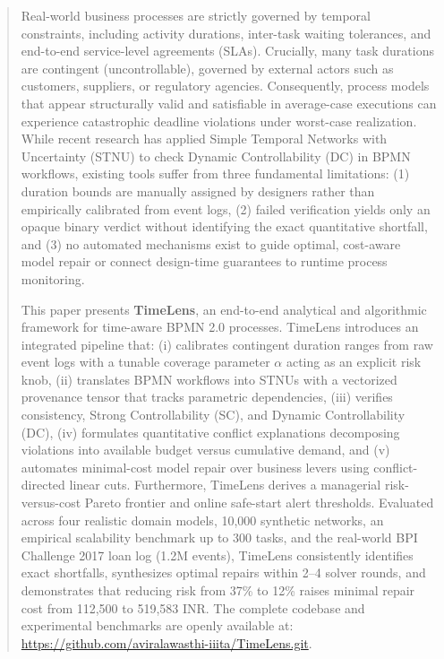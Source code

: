 \documentclass[conference]{IEEEtran}
\begin{document}
\begin{abstract}
Real-world business processes are strictly governed by temporal constraints, including activity durations, inter-task waiting tolerances, and end-to-end service-level agreements (SLAs). Crucially, many task durations are contingent (uncontrollable), governed by external actors such as customers, suppliers, or regulatory agencies. Consequently, process models that appear structurally valid and satisfiable in average-case executions can experience catastrophic deadline violations under worst-case realization. While recent research has applied Simple Temporal Networks with Uncertainty (STNU) to check Dynamic Controllability (DC) in BPMN workflows, existing tools suffer from three fundamental limitations: (1) duration bounds are manually assigned by designers rather than empirically calibrated from event logs, (2) failed verification yields only an opaque binary verdict without identifying the exact quantitative shortfall, and (3) no automated mechanisms exist to guide optimal, cost-aware model repair or connect design-time guarantees to runtime process monitoring. 

This paper presents \textbf{TimeLens}, an end-to-end analytical and algorithmic framework for time-aware BPMN 2.0 processes. TimeLens introduces an integrated pipeline that: (i) calibrates contingent duration ranges from raw event logs with a tunable coverage parameter $\alpha$ acting as an explicit risk knob, (ii) translates BPMN workflows into STNUs with a vectorized provenance tensor that tracks parametric dependencies, (iii) verifies consistency, Strong Controllability (SC), and Dynamic Controllability (DC), (iv) formulates quantitative conflict explanations decomposing violations into available budget versus cumulative demand, and (v) automates minimal-cost model repair over business levers using conflict-directed linear cuts. Furthermore, TimeLens derives a managerial risk-versus-cost Pareto frontier and online safe-start alert thresholds. Evaluated across four realistic domain models, 10,000 synthetic networks, an empirical scalability benchmark up to 300 tasks, and the real-world BPI Challenge 2017 loan log (1.2M events), TimeLens consistently identifies exact shortfalls, synthesizes optimal repairs within 2--4 solver rounds, and demonstrates that reducing risk from 37\% to 12\% raises minimal repair cost from 112,500 to 519,583 INR. The complete codebase and experimental benchmarks are openly available at: \url{https://github.com/aviralawasthi-iiita/TimeLens.git}.
\end{abstract}
\end{document}
